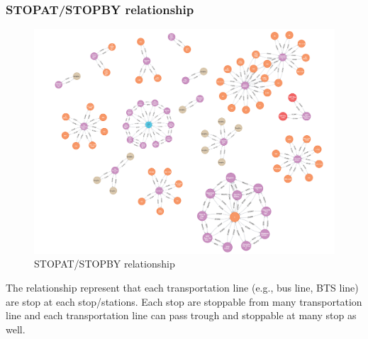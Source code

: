 \subsubsection{STOPAT/STOPBY relationship}
\begin{figure}[!h]
	\centering
	\includegraphics[width=1\linewidth]{chapter3/stopat_relationship.png}
	\caption{STOPAT/STOPBY relationship}
	\label{fig:STOPAT/STOPBY relationship}
\end{figure}
The relationship represent that each transportation line (e.g., bus line, BTS line) are stop at each stop/stations. Each stop are stoppable from many transportation line and each transportation line can pass trough and stoppable at many stop as well.